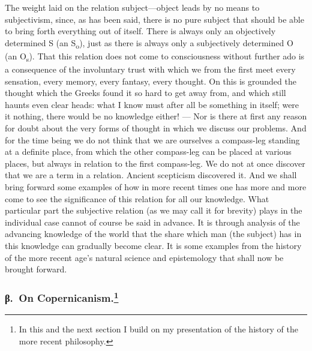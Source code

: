 \documentclass[12pt]{article}
\newcommand{\opage}[1]{\marginnote{\footnotesize\textit{[#1]}}}
\begin{document}
The weight laid on the relation subject---object leads by no means to
subjectivism, since, as has been said, there is no pure subject that should
be able to bring forth everything out of itself. There is always only an
objectively \opage{62}determined S (an S\textsubscript{o}), just as there is always
only a subjectively determined O (an O\textsubscript{s}). That this relation
does not come to consciousness without further ado is a consequence of the
involuntary trust with which we from the first meet every sensation, every
memory, every fantasy, every thought. On this is grounded the thought which
the Greeks found it so hard to get away from, and which still haunts even
clear heads: what I know must after all be something in itself; were it
nothing, there would be no knowledge either! --- Nor is there at first any
reason for doubt about the very forms of thought in which we discuss our
problems. And for the time being we do not think that we are ourselves a
compass-leg standing at a definite place, from which the other compass-leg
can be placed at various places, but always in relation to the first
compass-leg. We do not at once discover that we are a term in a relation.
Ancient scepticism discovered it. And we shall bring forward some examples
of how in more recent times one has more and more come to see the
significance of this relation for all our knowledge. What particular part
the subjective relation (as we may call it for brevity) plays in the
individual case cannot of course be said in advance. It is through analysis
of the advancing knowledge of the world that the share which man (the
subject) has in this knowledge can gradually become clear. It is some
examples from the history of the more recent age's natural science and
epistemology that shall now be brought forward.

\subsubsection*{β.~On Copernicanism.\footnote{In this and the next section I
build on my presentation of the history of the more recent philosophy.}}%
%
\label{sec:3d-beta}%
\end{document}

